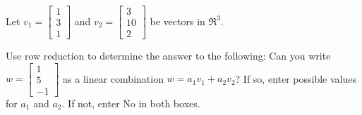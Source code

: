 






\endedxvertical









Let $v_1 = \left[\begin{array}{c} 1 \\ 3  \\ 1 \end{array} \right]$ and  
$v_2 = \left[\begin{array}{c} 3 \\ 10  \\ 2 \end{array} \right]$  be vectors in $\Re^3$.

Use row reduction to determine the answer to the following: 
Can you write $w = \left[\begin{array}{c} 1 \\ 5 \\ -1 \end{array} \right]$
as a linear combination $w = a_1 v_1 + a_2 v_2$?  If so, enter possible values for $a_1$ and
$a_2$.  If not, enter No in both boxes.  


